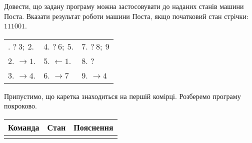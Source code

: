 \documentclass[a4paper,oneside,DIV=12,12pt]{scrartcl}
\begin{document}
	\begin{exercise}
		Довести, що задану програму можна застосовувати до наданих станів машини Поста. Вказати результат роботи машини Поста, якщо початковий стан стрічки: $111001$.
		
		\begin{longtable}[c]{lll}
			\endhead
			\endfoot
			1. $?~3;~2$. & 4. $?~6;~5$.       & 7. $?~8;~9$ \\ 
			2. $\to 1$.  & 5. $\leftarrow 1$. & 8. $?$ \\
			3. $\to 4$.  & 6. $\rightarrow 7$ & 9. $\rightarrow 4$
		\end{longtable}
		
	\end{exercise}
	
	\begin{solution}
		Припустимо, що каретка знаходиться на першій комірці. Розберемо програму покроково.
		
		\begin{longtable}[c]{llv{0.6\textwidth}}
			\toprule
				Команда  & Стан & Пояснення\\
			\midrule
			\endhead
			\bottomrule
			\endfoot
			

\end{longtable}
\end{solution}
\end{document}
